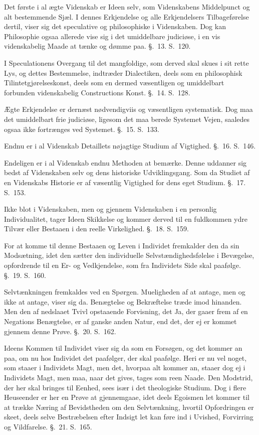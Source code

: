 \documentclass[12pt,a4paper]{book}
\newcommand{\opage}[1]{\marginnote{\footnotesize\textit{[#1]}}}
\begin{document}
\opage{XV} Det første i al ægte Videnskab er Ideen selv, som Videnskabens Middelpunct og
alt bestemmende Sjæl. I dennes Erkjendelse og alle Erkjendelsers
Tilbageførelse dertil, viser sig det speculative og philosophiske i
Videnskaben. Dog kan Philosophie ogsaa allerede vise sig i det umiddelbare
judiciøse, i en vis videnskabelig Maade at tænke og dømme paa. §.~13. S.~120.

I Speculationens Overgang til det mangfoldige, som derved skal skues i sit
rette Lys, og dettes Bestemmelse, indtræder Dialectiken, deels som en
philosophisk Tilintetgjørelseskonst, deels som en dermed væsentligen og
umiddelbart forbunden videnskabelig Constructions Konst. §.~14. S.~128.

Ægte Erkjendelse er dernæst nødvendigviis og væsentligen systematisk. Dog maa
det umiddelbart frie judiciøse, ligesom det maa berede Systemet Vejen,
saaledes ogsaa ikke fortrænges ved Systemet. §.~15. S.~133.

Endnu er i al Videnskab Detaillets nøjagtige Studium af Vigtighed. §.~16.
S.~146.

Endeligen er i al Videnskab endnu Methoden at bemærke. Denne uddanner sig
bedst af Videnskaben selv og dens historiske Udviklingsgang. Som da Studiet
af en Videnskabs Historie er af væsentlig Vigtighed for dens eget Studium.
§.~17. S.~153.

Ikke blot i Videnskaben, men og gjennem Videnskaben i en personlig
Individualitet, tager Ideen Skikkelse og kommer derved til en fuldkommen ydre
Tilvær eller Bestaaen i den reelle Virkelighed. §.~18. S.~159.

For at komme til denne Bestaaen og Leven i Individet fremkalder den da sin
Modsætning, idet den sætter den individuelle Selvstændighedsfølelse i
Bevægelse, opfordrende til en Er- og Vedkjendelse, som fra Individets Side
skal paafølge. §.~19. S.~160.

\opage{XVI} Selvtænkningen fremkaldes ved en Spørgen. Mueligheden af at antage, men og
ikke at antage, viser sig da. Benægtelse og Bekræftelse træde imod hinanden.
Men den af nedslaaet Tvivl opstaaende Forvisning, det Ja, der gaaer frem af en
Negations Benægtelse, er af ganske anden Natur, end det, der ej er kommet
gjennem denne Prøve. §.~20. S.~162.

Ideens Kommen til Individet viser sig da som en Forsøgen, og det kommer an
paa, om nu hos Individet det paafølger, der skal paafølge. Heri er nu vel
noget, som staaer i Individets Magt, men det, hvorpaa alt kommer an, staaer
dog ej i Individets Magt, men maa, naar det gives, tages som reen Naade. Den
Modstrid, der her skal bringes til Eenhed, sees især i det theologiske
Studium. Dog i flere Heuseender er her en Prøve at gjennemgaae, idet deels
Egoismen let kommer til at trække Næring af Bevidstheden om den Selvtænkning,
hvortil Opfordringen er skeet, deels selve Bestræbelsen efter Indsigt let kan
føre ind i Uvished, Forvirring og Vildfarelse. §.~21. S.~165.
\end{document}

